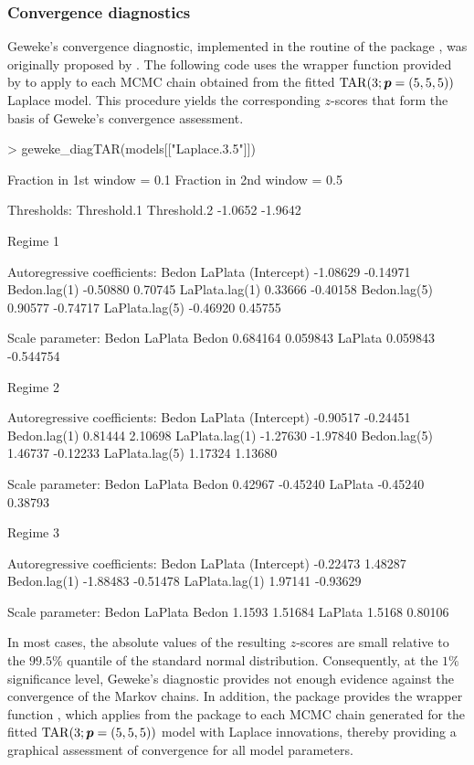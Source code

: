 \subsubsection{Convergence diagnostics}
Geweke's convergence diagnostic, implemented in the routine  of the package , was originally proposed by \cite{G92}. The following code uses the wrapper function  provided by  to apply  to each MCMC chain obtained from the fitted ${\rm TAR}(3;\bm{p}=(5,5,5))$ Laplace model. This procedure yields the corresponding $z$-scores that form the basis of Geweke’s convergence assessment.
\begin{example}
> geweke_diagTAR(models[["Laplace.3.5"]])

Fraction in 1st window = 0.1
Fraction in 2nd window = 0.5

Thresholds:
Threshold.1 Threshold.2 
    -1.0652     -1.9642 

Regime 1

Autoregressive coefficients:
                  Bedon  LaPlata
(Intercept)    -1.08629 -0.14971
Bedon.lag(1)   -0.50880  0.70745
LaPlata.lag(1)  0.33666 -0.40158
Bedon.lag(5)    0.90577 -0.74717
LaPlata.lag(5) -0.46920  0.45755

Scale parameter:
           Bedon   LaPlata
Bedon   0.684164  0.059843
LaPlata 0.059843 -0.544754


Regime 2

Autoregressive coefficients:
                  Bedon  LaPlata
(Intercept)    -0.90517 -0.24451
Bedon.lag(1)    0.81444  2.10698
LaPlata.lag(1) -1.27630 -1.97840
Bedon.lag(5)    1.46737 -0.12233
LaPlata.lag(5)  1.17324  1.13680

Scale parameter:
           Bedon  LaPlata
Bedon    0.42967 -0.45240
LaPlata -0.45240  0.38793


Regime 3

Autoregressive coefficients:
                  Bedon  LaPlata
(Intercept)    -0.22473  1.48287
Bedon.lag(1)   -1.88483 -0.51478
LaPlata.lag(1)  1.97141 -0.93629

Scale parameter:
         Bedon LaPlata
Bedon   1.1593 1.51684
LaPlata 1.5168 0.80106
\end{example}
In most cases, the absolute values of the resulting $z$-scores are small relative to the $99.5\%$ quantile of the standard normal distribution. Consequently, at the $1\%$ significance level, Geweke's diagnostic provides not enough evidence against the convergence of the Markov chains. 
In addition, the  package provides the wrapper function , which applies  from the  package to each MCMC chain generated for the fitted ${\rm TAR}(3;\bm{p}=(5,5,5))$ model with Laplace innovations, thereby providing a graphical assessment of convergence for all model parameters.

